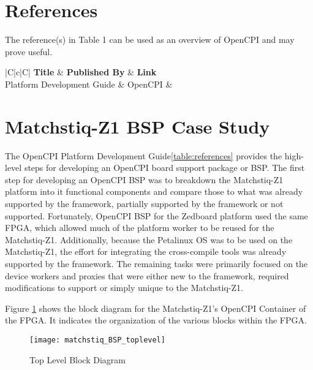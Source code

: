 \tableofcontents
\newpage

\section{References}

The reference(s) in Table 1 can be used as an overview of OpenCPI and may prove useful.

\begin{center}
  \begin{table}[H]
  \begin{tabularx}{\textwidth}{|C|c|C|}
    \hline
    \textbf{Title} & \textbf{Published By} & \textbf{Link} \\
    \hline
	Platform Development Guide & OpenCPI & \\
    \hline
  \end{tabularx}
  \caption {References}
  \label{table:references}
  \end{table}
\end{center}

\newpage
\section{Matchstiq-Z1 BSP Case Study}
The OpenCPI Platform Development Guide\ref{table:references} provides the high-level steps for developing an OpenCPI board support package or BSP. The first step for developing an OpenCPI BSP was to breakdown the Matchstiq-Z1 platform into it functional components and compare those to what was already supported by the framework, partially supported by the framework or not supported. Fortunately, OpenCPI BSP for the Zedboard platform used the same FPGA, which allowed much of the platform worker to be reused for the Matchstiq-Z1. Additionally, because the Petalinux OS was to be used on the Matchstiq-Z1, the effort for integrating the cross-compile tools was already supported by the framework. The remaining tasks were primarily focused on the device workers and proxies that were either new to the framework, required modifications to support or simply unique to the Matchstiq-Z1.\\ \par\medskip

\noindent Figure \ref{fig:toplevel} shows the block diagram for the Matchstiq-Z1's OpenCPI Container of the FPGA. It indicates the organization of the various blocks within the FPGA.
    \begin{figure}[H]
      \centerline{\texttt{[image: matchstiq\_BSP\_toplevel]}}
      \caption{Top Level Block Diagram}
      \label{fig:toplevel}
    \end{figure}

